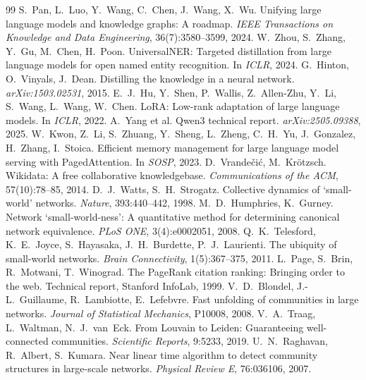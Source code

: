\documentclass[11pt]{article}
\begin{document}
\begingroup\small
\begin{thebibliography}{99}\setlength{\itemsep}{1pt}
 S.~Pan, L.~Luo, Y.~Wang, C.~Chen, J.~Wang, X.~Wu. Unifying large language models and knowledge graphs: A roadmap. \textit{IEEE Transactions on Knowledge and Data Engineering}, 36(7):3580--3599, 2024.
 W.~Zhou, S.~Zhang, Y.~Gu, M.~Chen, H.~Poon. UniversalNER: Targeted distillation from large language models for open named entity recognition. In \textit{ICLR}, 2024.
 G.~Hinton, O.~Vinyals, J.~Dean. Distilling the knowledge in a neural network. \textit{arXiv:1503.02531}, 2015.
 E.~J.~Hu, Y.~Shen, P.~Wallis, Z.~Allen-Zhu, Y.~Li, S.~Wang, L.~Wang, W.~Chen. LoRA: Low-rank adaptation of large language models. In \textit{ICLR}, 2022.
 A.~Yang et al. Qwen3 technical report. \textit{arXiv:2505.09388}, 2025.
 W.~Kwon, Z.~Li, S.~Zhuang, Y.~Sheng, L.~Zheng, C.~H.~Yu, J.~Gonzalez, H.~Zhang, I.~Stoica. Efficient memory management for large language model serving with PagedAttention. In \textit{SOSP}, 2023.
 D.~Vrande\v{c}i\'{c}, M.~Kr\"{o}tzsch. Wikidata: A free collaborative knowledgebase. \textit{Communications of the ACM}, 57(10):78--85, 2014.
 D.~J.~Watts, S.~H.~Strogatz. Collective dynamics of `small-world' networks. \textit{Nature}, 393:440--442, 1998.
 M.~D.~Humphries, K.~Gurney. Network `small-world-ness': A quantitative method for determining canonical network equivalence. \textit{PLoS ONE}, 3(4):e0002051, 2008.
 Q.~K.~Telesford, K.~E.~Joyce, S.~Hayasaka, J.~H.~Burdette, P.~J.~Laurienti. The ubiquity of small-world networks. \textit{Brain Connectivity}, 1(5):367--375, 2011.
 L.~Page, S.~Brin, R.~Motwani, T.~Winograd. The PageRank citation ranking: Bringing order to the web. Technical report, Stanford InfoLab, 1999.
 V.~D.~Blondel, J.-L.~Guillaume, R.~Lambiotte, E.~Lefebvre. Fast unfolding of communities in large networks. \textit{Journal of Statistical Mechanics}, P10008, 2008.
 V.~A.~Traag, L.~Waltman, N.~J.~van~Eck. From Louvain to Leiden: Guaranteeing well-connected communities. \textit{Scientific Reports}, 9:5233, 2019.
 U.~N.~Raghavan, R.~Albert, S.~Kumara. Near linear time algorithm to detect community structures in large-scale networks. \textit{Physical Review E}, 76:036106, 2007.

\end{thebibliography}
\end{document}
